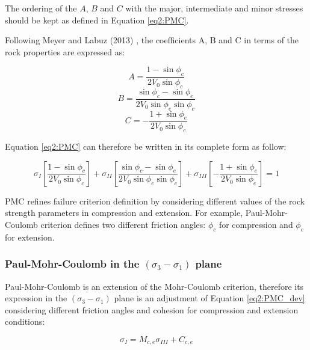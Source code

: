 The ordering of the $A$, $B$ and $C$ with the major, intermediate and minor stresses should be kept as defined in Equation \ref{eq2:PMC}. 

Following Meyer and Labuz (2013) \cite{Meyer2013}, the coefficients A, B and C in terms of the rock properties are expressed as:

\begin{equation}\label{pmc_Acoeff}
    A = \frac{1-\sin \phi_c}{2V_0\sin \phi_c}
\end{equation}
\begin{equation}\label{pmc_Bcoeff}
    B = \frac{\sin \phi_c - \sin \phi_e}{2V_0 \sin \phi_e \sin \phi_c}
\end{equation}
\begin{equation}\label{pmc_Ccoeff}
    C = -\frac{1+\sin \phi_e}{2V_0\sin \phi_e}
\end{equation}

Equation \ref{eq2:PMC} can therefore be written in its complete form as follow:

\begin{equation}\label{eq2:PMC_dev}
    \sigma_{I}\left[\frac{1-\sin \phi_{c}}{2 V_{0} \sin \phi_{c}}\right]+\sigma_{II}\left[\frac{\sin \phi_{c}-\sin \phi_{e}}{2 V_{0} \sin \phi_{e} \sin \phi_{c}}\right]+\sigma_{III}\left[-\frac{1+\sin \phi_{e}}{2 V_{0} \sin \phi_{e}}\right]=1
\end{equation}

PMC refines failure criterion definition by considering different values of the rock strength parameters in compression and extension. For example, Paul-Mohr-Coulomb criterion defines two different friction angles: $\phi_c$ for compression and $\phi_e$ for extension. 

\subsubsection{Paul-Mohr-Coulomb in the \texorpdfstring{$(\sigma_3 -\sigma_1)$}{sigma 3 - sigma 1} plane}\label{ch2:PMCsig1sig3}

Paul-Mohr-Coulomb is an extension of the Mohr-Coulomb criterion, therefore its expression in the $(\sigma_3 -\sigma_1)$ plane is an adjustment of Equation \ref{eq2:PMC_dev} considering different friction angles and cohesion for compression and extension conditions: 

\begin{equation}\label{eq2:PMC_sig1sig3}
    \sigma_I = M_{c,e}\sigma_{III}+C_{c,e}
\end{equation}

